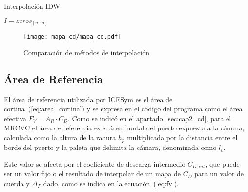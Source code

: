 \begin{algorithm}
    \caption{Interpolación IDW}\label{algo:IDW}


    \BlankLine
    $I=zeros_{[n,m]}$\;
\end{algorithm}


\begin{figure}
    \centering
    \texttt{[image: mapa\_cd/mapa\_cd.pdf]}
    \caption{Comparación de métodos de interpolación}\label{fig:mapas_interpolados}
\end{figure}


\subsection{Área de Referencia}
%
El área de referencia utilizada por ICESym es el área de
cortina~(\ref{eq:area_cortina}) y se expresa en el código del programa como el
área efectiva $F_{V}=A_{R}\cdot C_{D}$.
%
Como se indicó en el apartado~\ref{sec:cap2_cd}, para el  MRCVC el área de
referencia es el área frontal del puerto expuesta a la cámara, calculada como la
altura de la ranura $h_{p}$ multiplicada por la distancia entre el borde del
puerto y la paleta que delimita la cámara, denominada como $l_{v}$.

%
%
Este valor se afecta por el coeficiente de descarga intermedio $C_{D,int}$, que
puede ser un valor fijo o el resultado de interpolar de un mapa de $C_D$ para un
valor de cuerda y $\Delta_P$ dado, como se indica en la ecuación~(\ref{eq:fv}).

